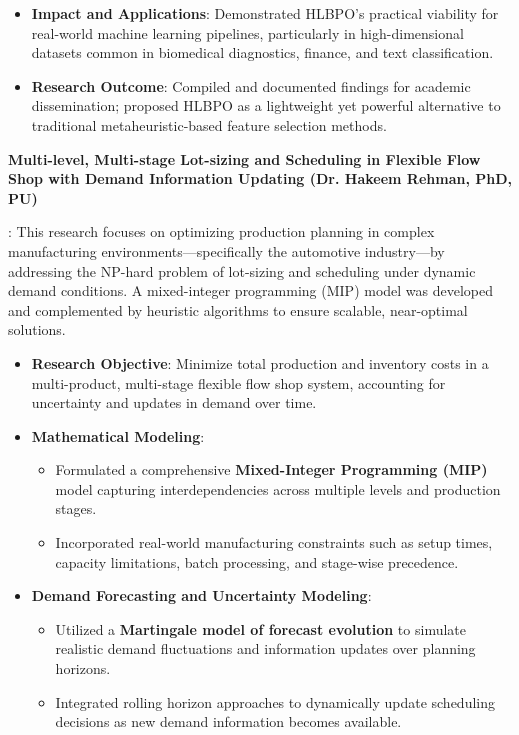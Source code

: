 \documentclass[letterpaper,10pt]{article}
\newcommand{\resumeItem}[2]{
  \item\small{
    \textbf{#1}{: #2 \vspace{-2pt}}
  }
}
\newcommand{\resumeSubItem}[2]{\resumeItem{#1}{#2}\vspace{-4pt}}
\begin{document}
{\begin{itemize}
\begin{itemize}
    \end{itemize}
    \item \textbf{Impact and Applications}: Demonstrated HLBPO's practical viability for real-world machine learning pipelines, particularly in high-dimensional datasets common in biomedical diagnostics, finance, and text classification.
    \item \textbf{Research Outcome}: Compiled and documented findings for academic dissemination; proposed HLBPO as a lightweight yet powerful alternative to traditional metaheuristic-based feature selection methods.
\end{itemize}
}

\resumeSubItem{Multi-level, Multi-stage Lot-sizing and Scheduling in Flexible Flow Shop with Demand Information Updating (Dr. Hakeem Rehman, PhD, PU)}
{This research focuses on optimizing production planning in complex manufacturing environments—specifically the automotive industry—by addressing the NP-hard problem of lot-sizing and scheduling under dynamic demand conditions. A mixed-integer programming (MIP) model was developed and complemented by heuristic algorithms to ensure scalable, near-optimal solutions.
\begin{itemize}
    \item \textbf{Research Objective}: Minimize total production and inventory costs in a multi-product, multi-stage flexible flow shop system, accounting for uncertainty and updates in demand over time.
    \item \textbf{Mathematical Modeling}:
    \begin{itemize}
        \item Formulated a comprehensive \textbf{Mixed-Integer Programming (MIP)} model capturing interdependencies across multiple levels and production stages.
        \item Incorporated real-world manufacturing constraints such as setup times, capacity limitations, batch processing, and stage-wise precedence.
    \end{itemize}
    \item \textbf{Demand Forecasting and Uncertainty Modeling}:
    \begin{itemize}
        \item Utilized a \textbf{Martingale model of forecast evolution} to simulate realistic demand fluctuations and information updates over planning horizons.
        \item Integrated rolling horizon approaches to dynamically update scheduling decisions as new demand information becomes available.

\end{itemize}
\end{itemize}}
\end{document}
